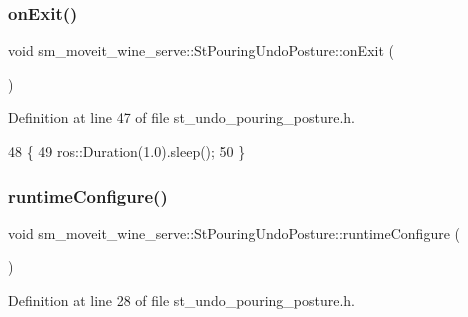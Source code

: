 \subsubsection{\texorpdfstring{on\+Exit()}{onExit()}}
{\footnotesize\ttfamily void sm\+\_\+moveit\+\_\+wine\+\_\+serve\+::\+St\+Pouring\+Undo\+Posture\+::on\+Exit (\begin{DoxyParamCaption}{ }\end{DoxyParamCaption})\hspace{0.3cm}{\ttfamily [inline]}}



Definition at line 47 of file st\+\_\+undo\+\_\+pouring\+\_\+posture.\+h.


\begin{DoxyCode}
48         \{
49             ros::Duration(1.0).sleep();
50         \}
\end{DoxyCode}
\mbox{\label{structsm__moveit__wine__serve_1_1StPouringUndoPosture_a43aae1e38ab92eab3f942279bf08890d}} 
\subsubsection{\texorpdfstring{runtime\+Configure()}{runtimeConfigure()}}
{\footnotesize\ttfamily void sm\+\_\+moveit\+\_\+wine\+\_\+serve\+::\+St\+Pouring\+Undo\+Posture\+::runtime\+Configure (\begin{DoxyParamCaption}{ }\end{DoxyParamCaption})\hspace{0.3cm}{\ttfamily [inline]}}



Definition at line 28 of file st\+\_\+undo\+\_\+pouring\+\_\+posture.\+h.



